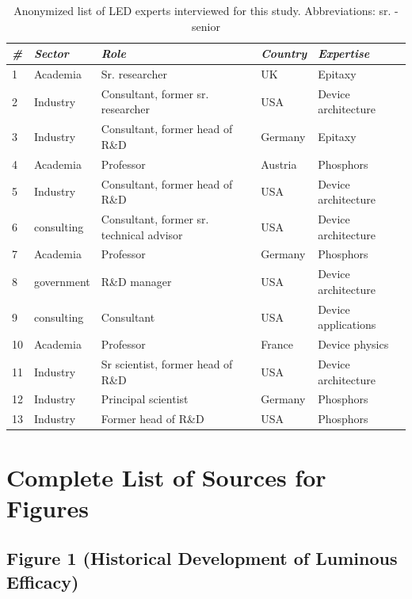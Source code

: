 \documentclass[10pt]{article}
\begin{document}
\begin{table}[h!]
\small
    \centering
    \begin{tabular}{|l|l|l|l|l|}
    \hline
        \textit{\#} & \textit{Sector} & \textit{Role} & \textit{Country} & \textit{Expertise} \\ \hline
        1 & Academia & Sr. researcher & UK & Epitaxy \\ \hline
        2 & Industry & Consultant, former sr. researcher & USA & Device architecture \\ \hline
        3 & Industry & Consultant, former head of R\&D & Germany & Epitaxy \\ \hline
        4 & Academia & Professor & Austria & Phosphors \\ \hline
        5 & Industry & Consultant, former head of R\&D & USA & Device architecture \\ \hline
        6 & consulting & Consultant, former sr. technical advisor & USA & Device architecture \\ \hline
        7 & Academia & Professor & Germany & Phosphors \\ \hline
        8 & government & R\&D manager & USA & Device architecture \\ \hline
        9 & consulting & Consultant & USA & Device applications \\ \hline
        10 & Academia & Professor & France & Device physics \\ \hline
        11 & Industry & Sr scientist, former head of R\&D & USA & Device architecture \\ \hline
        12 & Industry & Principal scientist & Germany & Phosphors \\ \hline
        13 & Industry & Former head of R\&D & USA & Phosphors \\ \hline
    \end{tabular}
    \label{tab:interviews}
    \caption{Anonymized list of LED experts interviewed for this study. Abbreviations: sr. - senior}
\end{table}

\clearpage
\newpage
\section{Complete List of Sources for Figures}
\label{sec:sources}

\subsection{Figure 1 (Historical Development of Luminous Efficacy)}
\end{document}
